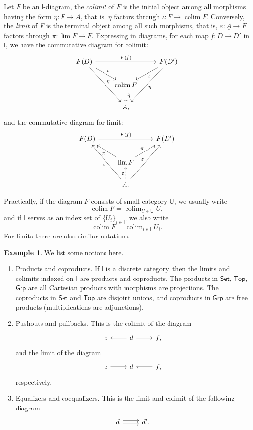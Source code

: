 \documentclass[a4paper]{amsart}
\theoremstyle{plain}
\theoremstyle{definition}
\newtheorem{eg}[thm]{Example}
\theoremstyle{remark}
\DeclareMathOperator*{\colim}{colim}
\begin{document}
Let $F$ be an $\mathsf{I}$-diagram, the \emph{colimit} of $F$ is the initial object among all morphisms having the form $\eta:F\to\underline{A}$, that is, $\eta$ factors through $\iota:F\to\underline{\colim{F}}$.
Conversely, the \emph{limit} of $F$ is the terminal object among all such morphisms, that is, $\varepsilon:\underline{A}\to F$ factors through $\pi:\underline{\lim{F}}\to F$.
Expressing in diagrams, for each map $f:D\to D'$ in $\mathsf{I}$, we have the commutative diagram for colimit:
\[\begin{tikzcd}
    F(D)\ar[rr, "{F(f)}"] \ar[dr, "\iota"] \ar[ddr, "\eta"] & & F(D') \ar[dl, "\iota"] \ar[ddl, "\eta"] \\
     & \colim{F} \ar[d, dashed, "{\tilde\eta}"] & \\
     & A, &
\end{tikzcd}\]
and the commutative diagram for limit:
\[\begin{tikzcd}
    F(D) \ar[rr, "{F(f)}"] & & F(D')\\
     & \lim{F} \ar[lu, "\pi"] \ar[ru, "\pi"] & \\
     & A. \ar[luu, "\varepsilon"] \ar[u, dashed, "{\tilde\varepsilon}"] \ar[ruu, "\varepsilon"]
\end{tikzcd}\]

Practically, if the diagram $F$ consists of small category $\mathsf{U}$, we usually write
\[\colim{F}=\colim_{U\in\mathsf{U}}U,\]
and if $\mathsf{I}$ serves as an index set of $\{U_i\}_{i\in\mathsf{I}}$, we also write
\[\colim{F}=\colim_{i\in\mathsf{I}}U_i.\]
For limits there are also similar notations.

\begin{eg}We list some notions here.
    \begin{enumerate}
        \item Products and coproducts.
        If $\mathsf{I}$ is a discrete category, then the limits and colimits indexed on $\mathsf{I}$ are products and coproducts.
        The products in $\mathsf{Set}$, $\mathsf{Top}$, $\mathsf{Grp}$ are all Cartesian products with morphisms are projections.
        The coproducts in $\mathsf{Set}$ and $\mathsf{Top}$ are disjoint unions, and coproducts in $\mathsf{Grp}$ are free products (multiplications are adjunctions).
        \item Pushouts and pullbacks.
        This is the colimit of the diagram
        \[\begin{tikzcd}
            e & d \ar[l] \ar[r] & f,
        \end{tikzcd}\]
        and the limit of the diagram
        \[\begin{tikzcd}
            e \ar[r] & d & f, \ar[l]
        \end{tikzcd}\]
        respectively.
        \item Equalizers and coequalizers.
        This is the limit and colimit of the following diagram
        \[\begin{tikzcd}
            d \ar[r, shift left] \ar[r, shift right] & d'.
        \end{tikzcd}\]
    \end{enumerate}
\end{eg}
\end{document}
